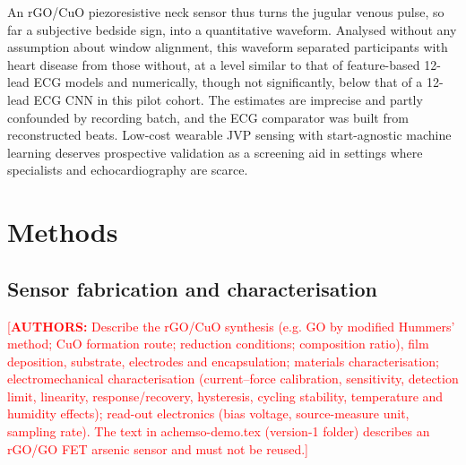 \documentclass[11pt]{article}
\newcommand{\authnote}[1]{\textcolor{red}{[\textbf{AUTHORS:} #1]}}
\begin{document}
An rGO/CuO piezoresistive neck sensor thus turns the jugular venous pulse, so far a subjective bedside sign, into a quantitative waveform. Analysed without any assumption about window alignment, this waveform separated participants with heart disease from those without, at a level similar to that of feature-based 12-lead ECG models and numerically, though not significantly, below that of a 12-lead ECG CNN in this pilot cohort. The estimates are imprecise and partly confounded by recording batch, and the ECG comparator was built from reconstructed beats. Low-cost wearable JVP sensing with start-agnostic machine learning deserves prospective validation as a screening aid in settings where specialists and echocardiography are scarce.
\section*{Methods}

\subsection*{Sensor fabrication and characterisation}
\authnote{Describe the rGO/CuO synthesis (e.g. GO by modified Hummers' method; CuO formation route; reduction conditions; composition ratio), film deposition, substrate, electrodes and encapsulation; materials characterisation; electromechanical characterisation (current--force calibration, sensitivity, detection limit, linearity, response/recovery, hysteresis, cycling stability, temperature and humidity effects); read-out electronics (bias voltage, source-measure unit, sampling rate). The text in achemso-demo.tex (version-1 folder) describes an rGO/GO FET arsenic sensor and must not be reused.}
\end{document}
